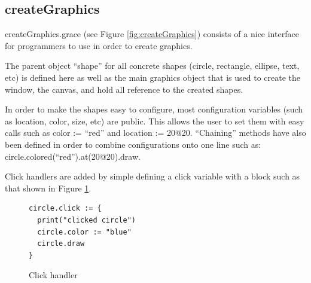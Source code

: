 \documentclass{article}
\begin{document}
\subsection{createGraphics}
createGraphics.grace (see Figure \ref{fig:createGraphics}) consists of a nice interface for
programmers to use in order to create graphics. 

The parent object ``shape'' for all concrete shapes (circle, rectangle, ellipse, text, etc) is
defined here as well as the main graphics object that is used to create the window, the
canvas, and hold all reference to the created shapes.

In order to make the shapes easy to configure, most configuration variables (such as location,
color, size, etc) are public. This allows the user to set them with easy calls such as
color := ``red'' and location := 20@20. ``Chaining'' methods have also been defined in order
to combine configurations onto one line such as: circle.colored(``red'').at(20@20).draw.

Click handlers are added by simple defining a click variable with a block such as that shown 
in Figure \ref{fig:click}.
\begin{figure}[h]
\begin{lstlisting}
circle.click := { 
  print("clicked circle") 
  circle.color := "blue"
  circle.draw
}
\end{lstlisting}
\caption{Click handler}
\label{fig:click}
\end{figure}
\end{document}
